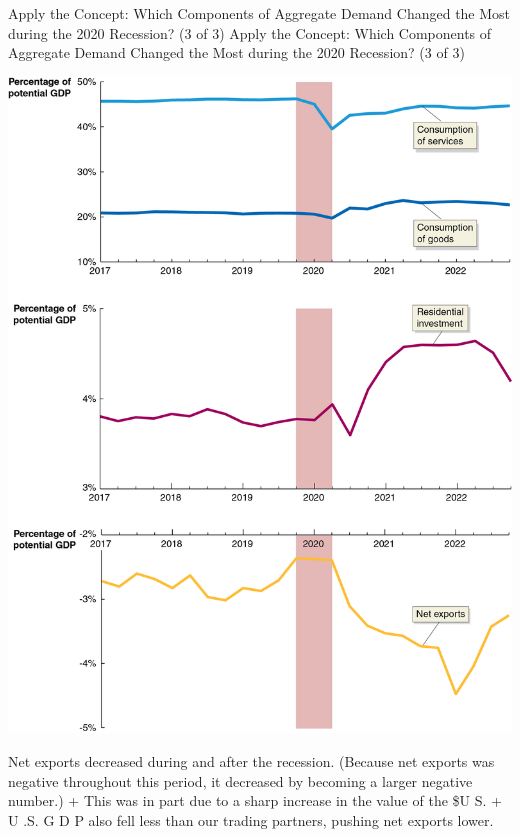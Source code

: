 \documentclass[
  12pt,
  ignorenonframetext,
]{beamer}
\begin{document}
\begin{frame}{Apply the Concept: Which Components of Aggregate Demand
Changed the Most during the 2020 Recession? (3 of 3)}
\protect\hypertarget{apply-the-concept-which-components-of-aggregate-demand-changed-the-most-during-the-2020-recession-3-of-3}{}
Apply the Concept: Which Components of Aggregate Demand Changed the Most
during the 2020 Recession? (3 of 3)

\includegraphics[width=\textwidth,height=0.99\textheight]{imgs3/img_slide19a.png}

Net exports decreased during and after the recession. (Because net
exports was negative throughout this period, it decreased by becoming a
larger negative number.) + This was in part due to a sharp increase in
the value of the \$U S. + U .S. G D P also fell less than our trading
partners, pushing net exports lower.
\end{frame}
\end{document}
